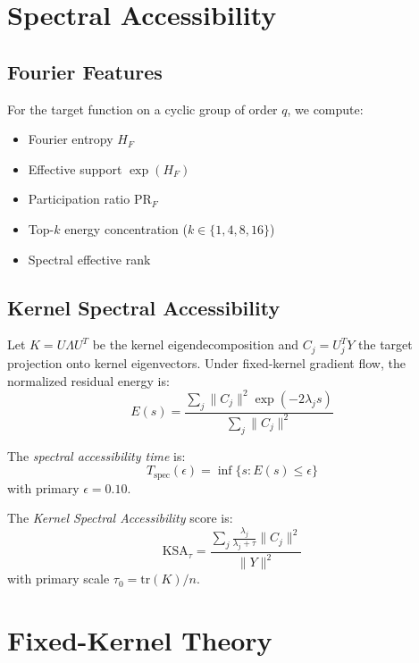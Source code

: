 \documentclass[11pt]{article}
\begin{document}
\section{Spectral Accessibility}\label{sec:spectral}

\subsection{Fourier Features}

For the target function on a cyclic group of order $q$, we compute:
\begin{itemize}[leftmargin=*]
    \item Fourier entropy $H_F$
    \item Effective support $\exp(H_F)$
    \item Participation ratio $\text{PR}_F$
    \item Top-$k$ energy concentration ($k \in \{1, 4, 8, 16\}$)
    \item Spectral effective rank
\end{itemize}

\subsection{Kernel Spectral Accessibility}

Let $K = U \Lambda U^T$ be the kernel eigendecomposition and $C_j = U_j^T Y$ the target projection onto kernel eigenvectors. Under fixed-kernel gradient flow, the normalized residual energy is:
\begin{equation}
E(s) = \frac{\sum_j \|C_j\|^2 \exp(-2\lambda_j s)}{\sum_j \|C_j\|^2}
\end{equation}

The \emph{spectral accessibility time} is:
\begin{equation}
T_{\text{spec}}(\epsilon) = \inf\{s : E(s) \leq \epsilon\}
\end{equation}
with primary $\epsilon = 0.10$.

The \emph{Kernel Spectral Accessibility} score is:
\begin{equation}
\text{KSA}_\tau = \frac{\sum_j \frac{\lambda_j}{\lambda_j + \tau} \|C_j\|^2}{\|Y\|^2}
\end{equation}
with primary scale $\tau_0 = \text{tr}(K)/n$.

\section{Fixed-Kernel Theory}\label{sec:theory}
\end{document}
